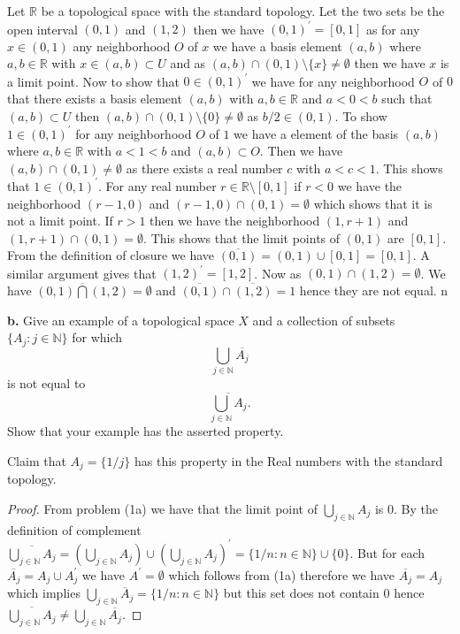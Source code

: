 \documentclass{amsart}
\theoremstyle{plain}
\theoremstyle{definition}
\theoremstyle{remark}
\begin{document}
Let $\mathbb{R}$ be a topological space with the standard topology. Let the two sets be the open interval $(0,1)$ and $(1,2)$ then we have $(0,1)^\prime=[0,1]$ as for any $x\in (0,1)$ any neighborhood $O$ of $x$ we have a basis element $(a,b)$ where $a,b\in \mathbb{R}$ with $x\in (a,b)\subset U$ and as $(a,b)\cap (0,1)\setminus \{x\}\not = \emptyset$ then we have $x$ is a limit point. Now to show that $0\in (0,1)^\prime$ we have for any neighborhood $O$ of $0$ that there exists a basis element $(a,b)$ with $a,b\in \mathbb R$ and $a<0<b$ such that $(a,b)\subset U$ then $(a,b)\cap (0,1)\setminus \{0\}\not = \emptyset$ as $b/2\in (0,1)$. To show $1\in (0,1)^\prime$ for any neighborhood $O$ of $1$ we have a element of the basis $(a,b)$ where $a,b\in \mathbb{R}$ with $a<1<b$ and $(a,b)\subset O$. Then we have $(a,b)\cap (0,1)\not = \emptyset$ as there exists a real number $c$ with $a<c<1$. This shows that $1\in (0,1)^\prime$. For any real number $r\in \mathbb{R}\setminus [0,1]$ if $r<0$ we have the neighborhood $(r-1,0)$ and $(r-1,0)\cap (0,1)= \emptyset$ which shows that it is not a limit point. If $r>1$ then we have the neighborhood $(1,r+1)$ and $(1,r+1)\cap (0,1)=\emptyset$. This shows that the limit points of $(0,1)$ are $[0,1]$. From the definition of closure we have $\overline {(0,1)}= (0,1)\cup [0,1]=[0,1]$. A similar argument gives that $(1,2)^\prime=[1,2]$. Now as $(0,1)\cap (1,2)=\emptyset$. We have $\overline{(0,1)\bigcap (1,2)}=\emptyset$ and $\overline{(0,1)}\cap \overline{(1,2)}={1}$ hence they are not equal. n



\vspace{.1in}
{\bfseries b.} Give an example of a topological space $X$ and a collection of subsets $\{ A_j : j\in \mathbb N \}$ for which 
\[
\bigcup _{j\in \mathbb N } \overline{A_j}
\]
is not equal to 
\[
\overline{\bigcup _{j\in \mathbb N } A_j}.
\]
Show that your example has the asserted property. 

Claim that $A_j=\{1/j\}$ has this property in the Real numbers with the standard topology.

\begin{proof}
    From problem (1a) we have that the limit point of $\bigcup_{j\in \mathbb{N}}A_j$ is ${0}$. By the definition of complement $\overline {\bigcup_{j\in \mathbb{N}}A_j}=(\bigcup_{j\in \mathbb{N}}A_j) \cup (\bigcup_{j\in \mathbb{N}}A_j)^\prime=\{1/n:n\in \mathbb{N}\}\cup \{0\}$. But for each $\overline {A_j}=A_j\cup A_j^\prime$ we have $A^\prime=\emptyset$ which follows from (1a) therefore we have $\overline{A_j}=A_j$ which implies $\bigcup_{j\in \mathbb{N}}\overline A_j=\{1/n:n\in \mathbb{N}\}$ but this set does not contain $0$ hence $\overline {\bigcup_{j\in \mathbb{N}}A_j}\not = \bigcup_{j\in \mathbb{N}}\overline{A_j}$. 
\end{proof}
\end{document}
